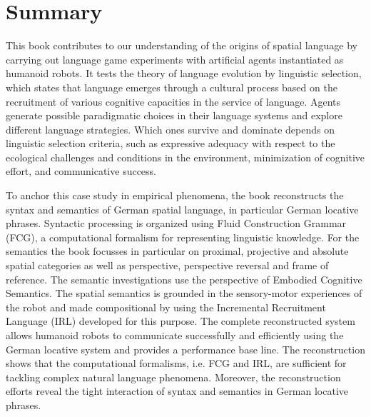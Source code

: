 %

\chapter*{Summary}
This book contributes to our understanding of the origins of spatial language
by carrying out language game experiments with artificial agents instantiated as
humanoid robots. It tests the theory of language evolution by linguistic selection,
which states that language emerges through a cultural process based on the recruitment of
various cognitive capacities in the service of language. Agents generate possible
paradigmatic choices in their language systems and explore different language strategies.
Which ones survive and dominate depends on linguistic selection criteria, such
as expressive adequacy with respect to the ecological challenges and conditions in the
environment, minimization of cognitive effort, and communicative success.

To anchor this case study in empirical phenomena,
the book reconstructs the syntax and semantics of German spatial language,
in particular German locative phrases. 
Syntactic processing is organized using Fluid Construction Grammar (FCG), 
a computational formalism for representing
linguistic knowledge. For the semantics the book focusses in particular
on proximal, projective and absolute spatial categories as well as perspective,
perspective reversal and frame of reference. The semantic investigations
use the perspective of Embodied Cognitive Semantics.
The spatial semantics is grounded in the sensory-motor experiences of the robot
and made compositional by using the Incremental Recruitment Language (IRL) developed
for this purpose. The complete reconstructed system allows humanoid robots to communicate successfully and efficiently using the German locative system and 
provides a performance base line. The reconstruction shows that the computational
formalisms, i.e. FCG and IRL, are sufficient for tackling complex natural language phenomena.
Moreover, the reconstruction efforts reveal the tight interaction of syntax and semantics 
in German locative phrases. 


